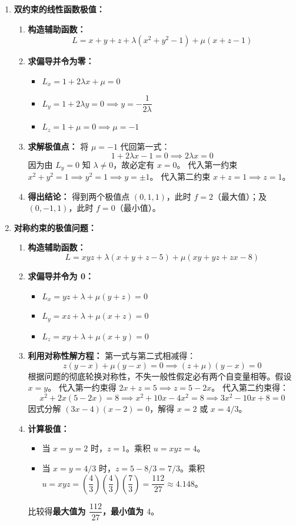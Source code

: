\documentclass[lang=cn,11pt]{elegantbook}
\begin{document}
\begin{solution}
\begin{enumerate}
  \item[(1)] \textbf{双约束的线性函数极值：}
  \begin{enumerate}
    \item \textbf{构造辅助函数：}
    \[
    L = x+y+z + \lambda(x^2+y^2-1) + \mu(x+z-1)
    \]
    \item \textbf{求偏导并令为零：}
    \begin{itemize}
      \item $L_x = 1+2\lambda x + \mu = 0$
      \item $L_y = 1+2\lambda y = 0 \implies y = -\dfrac{1}{2\lambda}$
      \item $L_z = 1+\mu = 0 \implies \mu = -1$
    \end{itemize}
    \item \textbf{求解极值点：}
    将 $\mu=-1$ 代回第一式：
    \[
    1+2\lambda x - 1 = 0 \implies 2\lambda x = 0
    \]
    因为由 $L_y=0$ 知 $\lambda \neq 0$，故必定有 $x=0$。
    代入第一约束 $x^2+y^2=1 \implies y^2=1 \implies y=\pm 1$。
    代入第二约束 $x+z=1 \implies z=1$。
    \item \textbf{得出结论：}
    得到两个极值点 $(0, 1, 1)$，此时 $f = 2$（最大值）；及 $(0, -1, 1)$，此时 $f = 0$（最小值）。
  \end{enumerate}

  \item[(2)] \textbf{对称约束的极值问题：}
  \begin{enumerate}
    \item \textbf{构造辅助函数：}
    \[
    L = xyz + \lambda(x+y+z-5) + \mu(xy+yz+zx-8)
    \]
    \item \textbf{求偏导并令为 0：}
    \begin{itemize}
      \item $L_x = yz + \lambda + \mu(y+z) = 0$
      \item $L_y = xz + \lambda + \mu(x+z) = 0$
      \item $L_z = xy + \lambda + \mu(x+y) = 0$
    \end{itemize}
    \item \textbf{利用对称性解方程：}
    第一式与第二式相减得：
    \[
    z(y-x) + \mu(y-x) = 0 \implies (z+\mu)(y-x) = 0
    \]
    根据问题的彻底轮换对称性，不失一般性假定必有两个自变量相等。假设 $x=y$。
    代入第一约束得 $2x+z=5 \implies z=5-2x$。
    代入第二约束得：
    \[
    x^2 + 2x(5-2x) = 8 \implies x^2 + 10x - 4x^2 = 8 \implies 3x^2 - 10x + 8 = 0
    \]
    因式分解 $(3x-4)(x-2)=0$，解得 $x=2$ 或 $x=4/3$。
    \item \textbf{计算极值：}
    \begin{itemize}
      \item 当 $x=y=2$ 时，$z=1$。乘积 $u = xyz = 4$。
      \item 当 $x=y=4/3$ 时，$z=5-8/3=7/3$。乘积 $u = xyz = \left(\dfrac{4}{3}\right)\left(\dfrac{4}{3}\right)\left(\dfrac{7}{3}\right) = \dfrac{112}{27} \approx 4.148$。
    \end{itemize}
    比较得\textbf{最大值为 $\dfrac{112}{27}$，最小值为 $4$}。
  \end{enumerate}


\end{enumerate}
\end{solution}
\end{document}
